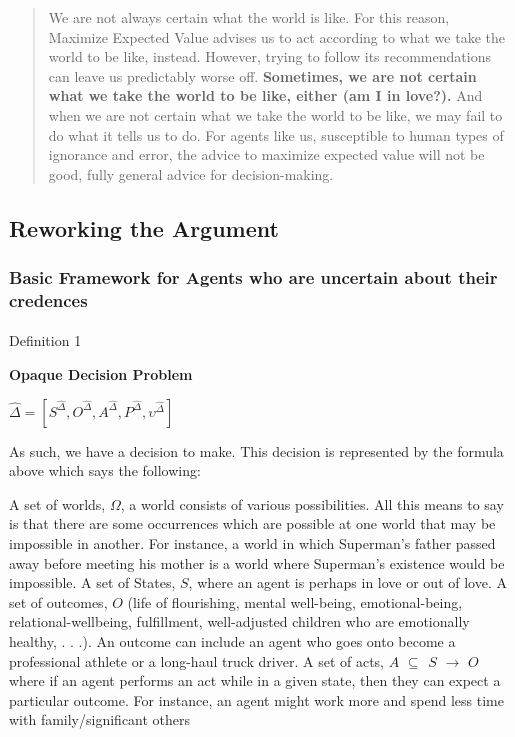 \documentclass[
  letterpaper,
  DIV=11,
  numbers=noendperiod]{scrartcl}
\makeatletter
\let\oldparagraph\paragraph
\renewcommand{\paragraph}{
    \@ifstar
      \xxxParagraphStar
      \xxxParagraphNoStar
  }
\newcommand{\xxxParagraphStar}[1]{\oldparagraph*{#1}\mbox{}}
\newcommand{\xxxParagraphNoStar}[1]{\oldparagraph{#1}\mbox{}}
\makeatother
\begin{document}
\begin{quote}
We are not always certain what the world is like. For this reason,
Maximize Expected Value advises us to act according to what we take the
world to be like, instead. However, trying to follow its recommendations
can leave us predictably worse off. \textbf{Sometimes, we are not
certain what we take the world to be like, either (am I in love?).} And
when we are not certain what we take the world to be like, we may fail
to do what it tells us to do. For agents like us, susceptible to human
types of ignorance and error, the advice to maximize expected value will
not be good, fully general advice for decision-making.
\end{quote}

\subsection{Reworking the Argument}\label{reworking-the-argument}

\subsubsection{Basic Framework for Agents who are uncertain about their
credences}\label{basic-framework-for-agents-who-are-uncertain-about-their-credences}

\paragraph{Definition 1}\label{definition-1}

\textbf{Opaque Decision Problem}

\(\hat\Delta = [S^{\hat\Delta}, O^{\hat\Delta}, A^{\hat\Delta}, P^{\hat\Delta}, \upsilon^{\hat\Delta}]\)

As such, we have a decision to make. This decision is represented by the
formula above which says the following:

A set of worlds, \(\Omega\), a world consists of various possibilities.
All this means to say is that there are some occurrences which are
possible at one world that may be impossible in another. For instance, a
world in which Superman's father passed away before meeting his mother
is a world where Superman's existence would be impossible. A set of
States, \(S\), where an agent is perhaps in love or out of love. A set
of outcomes, \(O\) (life of flourishing, mental well-being,
emotional-being, relational-wellbeing, fulfillment, well-adjusted
children who are emotionally healthy, . . .). An outcome can include an
agent who goes onto become a professional athlete or a long-haul truck
driver. A set of acts, \(A\) \emph{\textbf{\(\subseteq\) \(S\)}}
\(\rightarrow\) \(O\) where if an agent performs an act while in a given
state, then they can expect a particular outcome. For instance, an agent
might work more and spend less time with family/significant others
\end{document}
